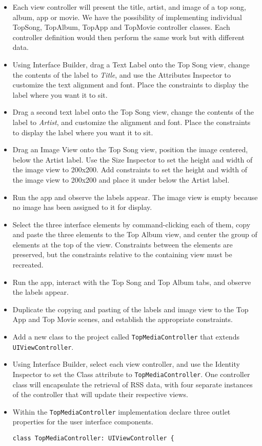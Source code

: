 \documentclass[a4paper,11pt]{scrartcl}
\begin{document}
\begin{itemize}
\item Each view controller will present the title, artist, and image of a top song, album, app or movie. We have the possibility of implementing individual TopSong, TopAlbum, TopApp and TopMovie controller classes. Each controller definition would then perform the same work but with different data.
\item Using Interface Builder, drag a Text Label onto the Top Song view, change the contents of the label to \textit{Title}, and use the Attributes Inspector to customize the text alignment and font. Place the constraints to display the label where you want it to sit.
\item Drag a second text label onto the Top Song view, change the contents of the label to \textit{Artist}, and customize the alignment and font. Place the constraints to display the label where you want it to sit.
\item Drag an Image View onto the Top Song view, position the image centered, below the Artist label. Use the Size Inspector to set the height and width of the image view to 200x200. Add constraints to set the height and width of the image view to 200x200 and place it under below the Artist label.
\item Run the app and observe the labels appear. The image view is empty because no image has been assigned to it for display.
\item Select the three interface elements by command-clicking each of them, copy and paste the three elements to the Top Album view, and center the group of elements at the top of the view. Constraints between the elements are preserved, but the constraints relative to the containing view must be recreated.
\item Run the app, interact with the Top Song and Top Album tabs, and observe the labels appear.
\item Duplicate the copying and pasting of the labels and image view to the Top App and Top Movie scenes, and establish the appropriate constraints.
\item Add a new class to the project called \texttt{TopMediaController} that extends \texttt{UIViewController}.
\item Using Interface Builder, select each view controller, and use the Identity Inspector to set the Class attribute to \texttt{TopMediaController}. One controller class will encapsulate the retrieval of RSS data, with four separate instances of the controller that will update their respective views.
\item Within the \texttt{TopMediaController} implementation declare three outlet properties for the user interface components.
\begin{lstlisting}
class TopMediaController: UIViewController {


\end{lstlisting}
\end{itemize}
\end{document}
